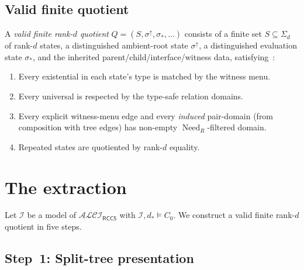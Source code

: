 \documentclass[11pt]{article}
\theoremstyle{definition}
\theoremstyle{remark}
\newcommand{\Need}{\operatorname{Need}}
\newcommand{\ALCIRCC}[1]{\mathcal{ALCI}_{\mathsf{RCC#1}}}
\begin{document}
\subsection{Valid finite quotient}

A \emph{valid finite rank-$d$ quotient}
$Q=(S,\sigma^\uparrow,\sigma_\ast,\ldots)$
consists of a finite set $S\subseteq\Sigma_d$ of rank-$d$ states, a
distinguished ambient-root state $\sigma^\uparrow$, a distinguished
evaluation state $\sigma_\ast$, and the inherited parent/child/interface/witness
data, satisfying~\cite[Definition~1.10]{SplitForest}:
\begin{enumerate}[label=(V\arabic*)]
\item Every existential in each state's type is matched by the witness
  menu.
\item Every universal is respected by the type-safe relation domains.
\item Every explicit witness-menu edge and every \emph{induced}
  pair-domain (from composition with tree edges) has non-empty
  $\Need_R$-filtered domain.
\item Repeated states are quotiented by rank-$d$ equality.
\end{enumerate}


\section{The extraction}
\label{sec:extraction}

Let $\mathcal{I}$ be a model of $\ALCIRCC{5}$ with
$\mathcal{I},d_\ast\models C_0$.  We construct a valid finite
rank-$d$ quotient in five steps.

\subsection{Step~1: Split-tree presentation}
\end{document}
